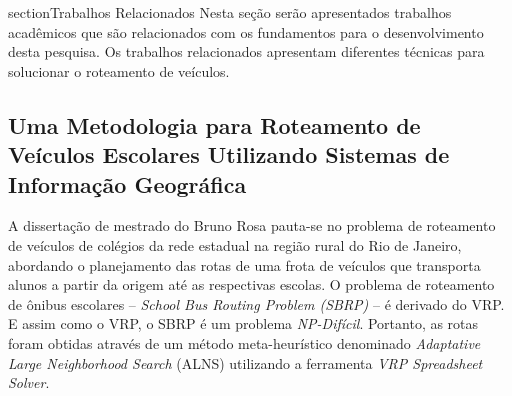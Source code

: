 section{Trabalhos Relacionados}
\label{relacionados}
Nesta seção serão apresentados trabalhos acadêmicos que são relacionados com os fundamentos para o desenvolvimento desta pesquisa. Os trabalhos relacionados apresentam diferentes técnicas para solucionar o roteamento de veículos.

\subsection{Uma Metodologia para Roteamento de Veículos Escolares Utilizando Sistemas de Informação Geográfica}

A dissertação de mestrado do Bruno Rosa pauta-se no problema de roteamento de veículos de colégios da rede estadual na região rural do Rio de Janeiro, abordando o planejamento das rotas de uma frota de veículos que transporta alunos a partir da origem até as respectivas escolas. O problema de roteamento de ônibus escolares -- \emph{School Bus Routing Problem (SBRP)} -- é derivado do VRP. E assim como o VRP, o SBRP é um problema \emph{NP-Difícil}. Portanto, as rotas foram obtidas através de um método meta-heurístico denominado \emph{Adaptative Large Neighborhood Search} (ALNS) utilizando a ferramenta \emph{VRP Spreadsheet Solver}.

